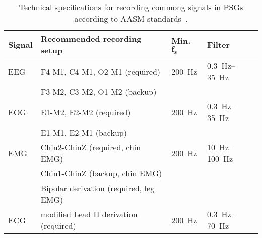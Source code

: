             \begin{table}[tb]
            \begin{threeparttable}
                \small
                \centering
                \caption[Technical specifications for recording \ac{PSG} signals]{Technical specifications for recording commong signals in \acp{PSG} according to \ac{AASM} standards~\cite{Berry2020}.}%
                \label{tab:aasm_recordings}
                \begin{tabular}{@{}llll@{}} \toprule
                    \textbf{Signal} & \textbf{Recommended recording setup} & \textbf{Min.} \(\mathbf{f_s}\) & \textbf{Filter} \\ \midrule
                    EEG & F4-M1, C4-M1, O2-M1 (required)    & \SI{200}{\hertz}  & \SIrange[range-units=single,range-phrase=--]{0.3}{35}{\hertz} \\
                        & F3-M2, C3-M2, O1-M2 (backup)      &                   &                                                               \\
                    EOG & E1-M2, E2-M2 (required)   & \SI{200}{\hertz}  & \SIrange[range-units=single,range-phrase=--]{0.3}{35}{\hertz} \\
                        & E1-M1, E2-M1 (backup)     &                   &                                                               \\
                    EMG & Chin2-ChinZ (required, chin EMG)  & \SI{200}{\hertz}  & \SIrange[range-units=single,range-phrase=--]{10}{100}{\hertz} \\
                        & Chin1-ChinZ (backup, chin EMG)    &                   &                                                               \\
                        & Bipolar derivation (required, leg EMG) & &                                            \\
                    ECG & modified Lead II derivation (required) & \SI{200}{\hertz} & \SIrange[range-units=single,range-phrase=--]{0.3}{70}{\hertz} \\ \bottomrule

\end{tabular}
\end{threeparttable}
\end{table}

